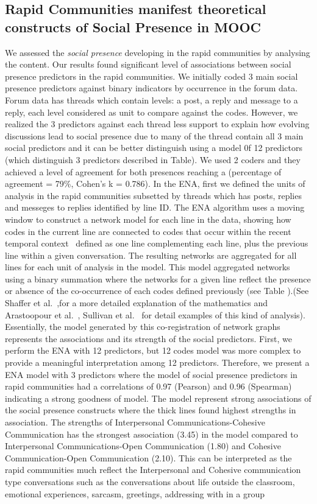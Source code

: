 \documentclass[manuscript,screen,review]{acmart}
\begin{document}
\subsection{Rapid Communities manifest theoretical constructs of Social Presence in MOOC}
We assessed the \textit{social presence} developing in the rapid communities by analysing the content. Our results found significant level of associations between social presence predictors in the rapid communities. We initially coded 3 main social presence predictors against binary indicators by occurrence in the forum data. Forum data has threads which contain levels: a post, a reply and message to a reply, each level considered as unit to compare against the codes. However, we realized the 3 predictors against each thread less support to explain how evolving discussions lead to social presence due to many of the thread contain all 3 main social predictors and it can be better distinguish using a model 0f 12 predictors (which distinguish 3 predictors described in Table). We used 2 coders and they achieved a level of agreement for both presences reaching a (percentage of agreement = 79\%, Cohen's k = 0.786). In the ENA, first we defined the units of analysis in the rapid communities subsetted by threads which has posts, replies and messeges to replies identified by line ID. The ENA algorithm uses a moving window to construct a network model for each line in the data, showing how codes in the current line are connected to codes that occur within the recent temporal context~\cite{siebert2017search} defined as one line complementing each line, plus the previous line within a given conversation. The resulting networks are aggregated for all lines for each unit of analysis in the model. This model aggregated networks using a binary summation where the networks for a given line reflect the presence or absence of the co-occurrence of each codes defined previously (see Table ).(See  Shaffer et al.~\cite{shaffer2016tutorial},for a more detailed explanation of the mathematics and Arastoopour et al.~\cite{arastoopour2015epistemic}, Sullivan et al.~\cite{sullivan2018using} for detail examples of this kind of analysis). Essentially, the model generated by this co-registration of network graphs represents  the associations and its strength of the social predictors. First, we perform the ENA with 12 predictors, but 12 codes model was more complex to provide a meaningful interpretation among 12 predictors. Therefore, we present a ENA model with 3 predictors where the model of social presence predictors in rapid communities had a correlations of 0.97 (Pearson) and 0.96 (Spearman) indicating a strong goodness of model. The model represent strong associations of the social presence constructs where the thick lines found highest strengths in association. The strengths of Interpersonal Communications-Cohesive Communication has the strongest association (3.45) in the model compared to Interpersonal Communications-Open Communication (1.80) and Cohesive Communication-Open Communication (2.10). This can be interpreted as the rapid communities much reflect the Interpersonal and Cohesive communication type conversations such as the conversations about life outside the classroom, emotional experiences, sarcasm, greetings, addressing with in a group 
\end{document}
